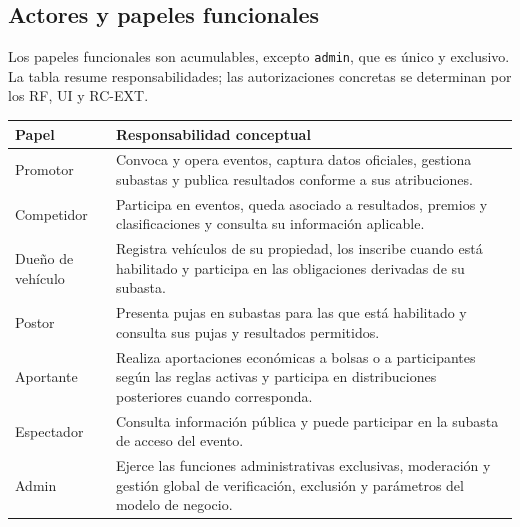 \documentclass[10pt,letterpaper]{article}
\begin{document}
\subsection{Actores y papeles funcionales}
Los papeles funcionales son acumulables, excepto \texttt{admin}, que es único y exclusivo. La tabla resume responsabilidades; las autorizaciones concretas se determinan por los RF, UI y RC-EXT.
\begin{longtable}{P{2.8cm}P{11.5cm}}
\toprule
\textbf{Papel} & \textbf{Responsabilidad conceptual}\\
\midrule
Promotor & Convoca y opera eventos, captura datos oficiales, gestiona subastas y publica resultados conforme a sus atribuciones.\\
Competidor & Participa en eventos, queda asociado a resultados, premios y clasificaciones y consulta su información aplicable.\\
Dueño de vehículo & Registra vehículos de su propiedad, los inscribe cuando está habilitado y participa en las obligaciones derivadas de su subasta.\\
Postor & Presenta pujas en subastas para las que está habilitado y consulta sus pujas y resultados permitidos.\\
Aportante & Realiza aportaciones económicas a bolsas o a participantes según las reglas activas y participa en distribuciones posteriores cuando corresponda.\\
Espectador & Consulta información pública y puede participar en la subasta de acceso del evento.\\
Admin & Ejerce las funciones administrativas exclusivas, moderación y gestión global de verificación, exclusión y parámetros del modelo de negocio.\\
\bottomrule
\end{longtable}
\end{document}
